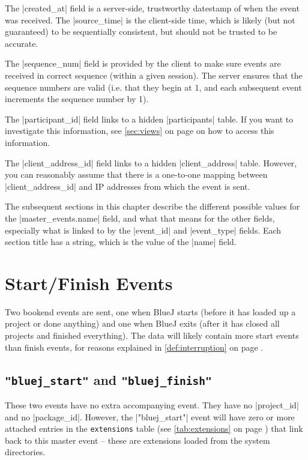 \documentclass{report}
\newcommand{\myref}[1]{\autoref{#1} on page \pageref*{#1}}
\newcommand{\tabref}[1]{\lstinline|#1| table (see \myref{tab:#1})}
\begin{document}
The |created_at| field is a server-side, trustworthy datestamp of when
the event was received.  The |source_time| is the client-side time,
which is likely (but not guaranteed) to be sequentially consistent, but should
not be trusted to be accurate.

The |sequence_num| field is provided by the client to make sure events are
received in correct sequence (within a given session).  The server ensures
that the sequence numbers are valid (i.e. that they begin at 1, and each
subsequent event increments the sequence number by 1).

\label{tab:participants}

The |participant_id| field links to a hidden |participants| table.  If you
want to investigate this information, see \myref{sec:views} on how to
access this information.

\label{tab:client_addresses}

The |client_address_id| field links to a hidden |client_address| table.
However, you can reasonably assume that there is a one-to-one mapping between
|client_address_id| and IP addresses from which the event is sent.


The subsequent sections in this chapter describe the different possible values for the
|master_events.name| field, and what that means for the other fields,
especially what is linked to by the |event_id| and |event_type| fields.  Each
section title has a string, which is the value of the |name| field.

\section{Start/Finish Events}

Two bookend events are sent, one when BlueJ starts (before it has loaded up a
project or done anything) and one when BlueJ exits (after it has closed all
projects and finished everything).  The data will likely contain more start
events than finish events, for reasons explained in \myref{def:interruption}.

\subsection{\lstinline!"bluej_start"! and \lstinline!"bluej_finish"!}
\label{evt:bluej_start}
\label{evt:bluej_finish}

These two events have no extra accompanying event.  They have no |project_id|
and no |package_id|.  However, the |"bluej_start"| event will have zero or more
attached entries in the \tabref{extensions} that link back to this master
event -- these are extensions loaded from the system directories.
\end{document}
